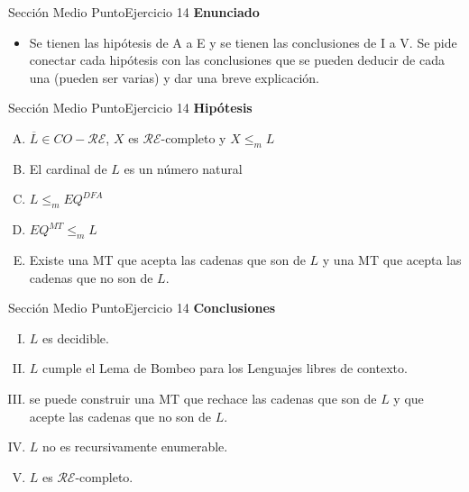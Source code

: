 \documentclass[10pt, envcountsect, presentation, aspectratio=169]{beamer}
\newcommand{\lr}{\ensuremath{\mathcal {RE}}}
\begin{document}

\begin{frame}{Sección Medio Punto}{Ejercicio 14}
    \textbf{Enunciado}
    \begin{itemize}
        \item Se tienen las hipótesis de A a E y se tienen las conclusiones de I a V. Se pide conectar cada hipótesis con las conclusiones que se pueden deducir de cada una (pueden ser varias) y dar una breve explicación.
    \end{itemize}
\end{frame}


\begin{frame}{Sección Medio Punto}{Ejercicio 14}
    \textbf{Hipótesis}
    \begin{enumerate}[A.]
        \item $\overline{L} \in CO-\lr$, $X$ es \lr-completo y $X \le_m  L$
        \item El cardinal de $L$ es un número natural
        \item $L \le_m  EQ^{DFA}$  
        \item $EQ^{MT} \le_m L$ 
        \item Existe una MT que acepta las cadenas que son de $L$ y una MT que acepta las cadenas que no son de $L$. 
    \end{enumerate}
\end{frame}


\begin{frame}{Sección Medio Punto}{Ejercicio 14}
    \textbf{Conclusiones}
    \begin{enumerate}[I.]
        \item $L$ es  decidible.
        \item $L$ cumple el Lema de Bombeo para los Lenguajes  libres de contexto.
        \item se puede construir una MT que rechace las cadenas que son de $L$ y que acepte las cadenas que no son de $L$.
        \item $L$ no es recursivamente enumerable.
        \item $L$ es \lr-completo. 
    \end{enumerate}
\end{frame}
\end{document}
